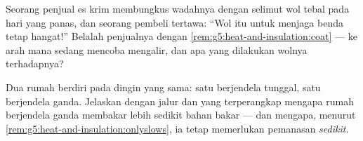 \begin{exercise}[$\star\star$]\label{exo:g5:heat-and-insulation:10}
Seorang penjual es krim membungkus wadahnya dengan selimut wol tebal
pada hari yang panas, dan seorang pembeli tertawa: ``Wol itu untuk
menjaga benda tetap hangat!'' Belalah penjualnya dengan
\cref{rem:g5:heat-and-insulation:coat} --- ke arah mana  sedang
mencoba mengalir, dan apa yang dilakukan wolnya terhadapnya?
\end{exercise}

\begin{exercise}[$\star\star$]\label{exo:g5:heat-and-insulation:11}
Dua rumah berdiri pada  dingin yang sama: satu berjendela
tunggal, satu berjendela ganda. Jelaskan dengan jalur dan  yang
terperangkap mengapa rumah berjendela ganda membakar lebih sedikit
bahan bakar --- dan mengapa, menurut
\cref{rem:g5:heat-and-insulation:onlyslows}, ia tetap memerlukan
pemanasan \emph{sedikit}.
\end{exercise}
